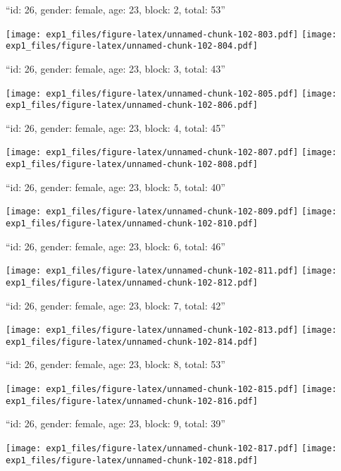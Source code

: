 \documentclass[11pt,,]{article}
\begin{document}
\newpage
[1] 

``id: 26, gender: female, age: 23, block: 2, total: 53''

\texttt{[image: exp1\_files/figure-latex/unnamed-chunk-102-803.pdf]}
\texttt{[image: exp1\_files/figure-latex/unnamed-chunk-102-804.pdf]}

\newpage
[1] 

``id: 26, gender: female, age: 23, block: 3, total: 43''

\texttt{[image: exp1\_files/figure-latex/unnamed-chunk-102-805.pdf]}
\texttt{[image: exp1\_files/figure-latex/unnamed-chunk-102-806.pdf]}

\newpage
[1] 

``id: 26, gender: female, age: 23, block: 4, total: 45''

\texttt{[image: exp1\_files/figure-latex/unnamed-chunk-102-807.pdf]}
\texttt{[image: exp1\_files/figure-latex/unnamed-chunk-102-808.pdf]}

\newpage
[1] 

``id: 26, gender: female, age: 23, block: 5, total: 40''

\texttt{[image: exp1\_files/figure-latex/unnamed-chunk-102-809.pdf]}
\texttt{[image: exp1\_files/figure-latex/unnamed-chunk-102-810.pdf]}

\newpage
[1] 

``id: 26, gender: female, age: 23, block: 6, total: 46''

\texttt{[image: exp1\_files/figure-latex/unnamed-chunk-102-811.pdf]}
\texttt{[image: exp1\_files/figure-latex/unnamed-chunk-102-812.pdf]}

\newpage
[1] 

``id: 26, gender: female, age: 23, block: 7, total: 42''

\texttt{[image: exp1\_files/figure-latex/unnamed-chunk-102-813.pdf]}
\texttt{[image: exp1\_files/figure-latex/unnamed-chunk-102-814.pdf]}

\newpage
[1] 

``id: 26, gender: female, age: 23, block: 8, total: 53''

\texttt{[image: exp1\_files/figure-latex/unnamed-chunk-102-815.pdf]}
\texttt{[image: exp1\_files/figure-latex/unnamed-chunk-102-816.pdf]}

\newpage
[1] 

``id: 26, gender: female, age: 23, block: 9, total: 39''

\texttt{[image: exp1\_files/figure-latex/unnamed-chunk-102-817.pdf]}
\texttt{[image: exp1\_files/figure-latex/unnamed-chunk-102-818.pdf]}
\end{document}
